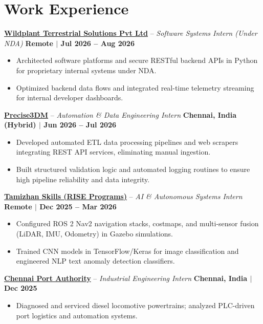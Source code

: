 \documentclass[letterpaper,10pt]{article}
\begin{document}
\section{Work Experience}
\noindent
\href{https://wildplant.in}{\textbf{Wildplant Terrestrial Solutions Pvt Ltd}} -- \textit{Software Systems Intern (Under NDA)} \hfill \textbf{Remote $|$ Jul 2026 -- Aug 2026} \\
\begin{itemize}
    \item Architected software platforms and secure RESTful backend APIs in Python for proprietary internal systems under NDA.
    \item Optimized backend data flows and integrated real-time telemetry streaming for internal developer dashboards.
\end{itemize}
\vspace{3pt}

\noindent
\href{https://precise3dm.com}{\textbf{Precise3DM}} -- \textit{Automation \& Data Engineering Intern} \hfill \textbf{Chennai, India (Hybrid) $|$ Jun 2026 -- Jul 2026} \\
\begin{itemize}
    \item Developed automated ETL data processing pipelines and web scrapers integrating REST API services, eliminating manual ingestion.
    \item Built structured validation logic and automated logging routines to ensure high pipeline reliability and data integrity.
\end{itemize}
\vspace{3pt}

\noindent
\href{https://tamizhanskill.com}{\textbf{Tamizhan Skills (RISE Programs)}} -- \textit{AI \& Autonomous Systems Intern} \hfill \textbf{Remote $|$ Dec 2025 -- Mar 2026} \\
\begin{itemize}
    \item Configured ROS 2 Nav2 navigation stacks, costmaps, and multi-sensor fusion (LiDAR, IMU, Odometry) in Gazebo simulations.
    \item Trained CNN models in TensorFlow/Keras for image classification and engineered NLP text anomaly detection classifiers.
\end{itemize}
\vspace{3pt}

\noindent
\href{https://chennaiport.gov.in}{\textbf{Chennai Port Authority}} -- \textit{Industrial Engineering Intern} \hfill \textbf{Chennai, India $|$ Dec 2025} \\
\begin{itemize}
    \item Diagnosed and serviced diesel locomotive powertrains; analyzed PLC-driven port logistics and automation systems.
\end{itemize}
\end{document}
